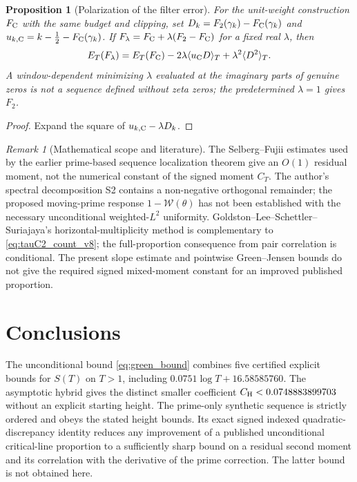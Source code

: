 \documentclass[11pt,reqno]{amsart}
\makeatletter
\let\CG@origcite\cite
\renewcommand*{\cite}[2][]{\def\CG@citekey{#2}%
  \ifx\relax#1\relax\CG@origcite{#2}\else\CG@origcite[#1]{#2}\fi}
\numberwithin{equation}{section}
\newtheorem{proposition}[theorem]{Proposition}
\theoremstyle{definition}
\theoremstyle{remark}
\newtheorem{remark}[theorem]{Remark}
\makeatother
\begin{document}
\begin{proposition}[Polarization of the filter error]
\label{prop:tauC2_polar_v8}
For the unit-weight construction $F_{\rm C}$ with the same
budget and clipping, set
$D_k=F_2(\gamma_k)-F_{\rm C}(\gamma_k)$ and
$u_{k,\rm C}=k-\frac12-F_{\rm C}(\gamma_k)$.
If $F_\lambda=F_{\rm C}+\lambda(F_2-F_{\rm C})$
for a fixed real $\lambda$, then
\begin{equation}
 E_T(F_\lambda)=E_T(F_{\rm C})
 -2\lambda\langle u_{\rm C}D\rangle_T
 +\lambda^2\langle D^2\rangle_T.
 \label{eq:tauC2_polar_v8}
\end{equation}
A window-dependent minimizing $\lambda$ evaluated at the
imaginary parts of genuine zeros is \emph{not} a sequence defined without zeta zeros; the
predetermined $\lambda=1$ gives $F_2$.
\end{proposition}
\begin{proof}
Expand the square of $u_{k,\rm C}-\lambda D_k$.
\end{proof}

\begin{remark}[Mathematical scope and literature]
\label{rem:tauC2_barrier_v8}
The Selberg--Fujii estimates used by the earlier
prime-based sequence localization theorem give an $O(1)$ residual
moment, not the numerical constant of the signed moment
$C_T$. The author's spectral decomposition S2 contains
a non-negative orthogonal remainder; the proposed moving-prime
response $1-\mathscr W(\theta)$ has not been established
with the necessary unconditional weighted-$L^2$ uniformity.
Goldston--Lee--Schettler--Suriajaya's horizontal-multiplicity
method \cite{GoldstonLeeSchettlerSuriajaya2026} is
complementary to \eqref{eq:tauC2_count_v8};
the full-proportion consequence from pair correlation is conditional.
The present slope estimate and pointwise Green--Jensen
bounds do not give the required signed mixed-moment
constant for an improved published proportion.
\end{remark}


\section{Conclusions}\label{sec:conclusions}
The unconditional bound \eqref{eq:green_bound}
combines five certified explicit bounds for $S(T)$
on $T>1$, including $0.0751\log T+16.58585760$.
The asymptotic hybrid gives the distinct smaller
coefficient $C_{\rm H}<0.0748883899703$ without
an explicit starting height. The prime-only
synthetic sequence is strictly ordered and obeys
the stated height bounds. Its exact signed
indexed quadratic-discrepancy identity reduces any improvement
of a published unconditional critical-line
proportion to a sufficiently sharp bound on
a residual second moment and its correlation
with the derivative of the prime correction.
The latter bound is not obtained here.
\end{document}
